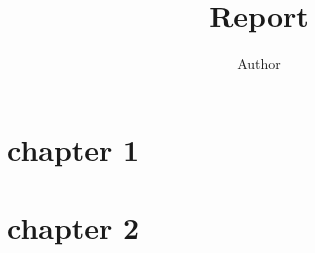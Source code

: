 \documentclass{article}
\title{Report}
\author{Author}
\begin{document}
\maketitle
\section{chapter 1}
\cite{example_ref}
\section{chapter 2}
\printbibliography
\end{document}
